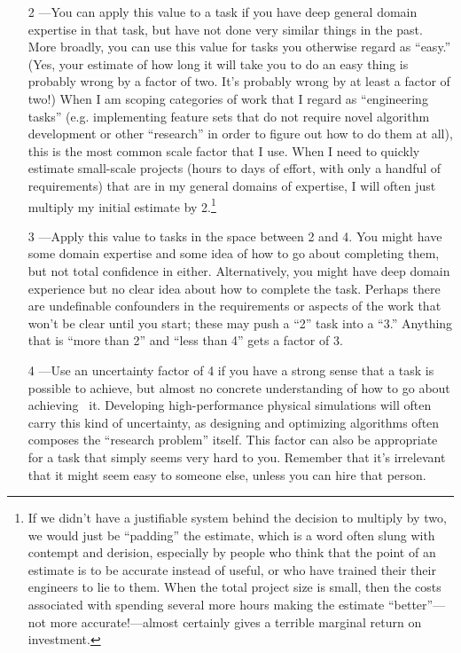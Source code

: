 \documentclass[12pt,oneside]{book}
\begin{document}
\begin{itemize}[wide, labelwidth=!, labelindent=0pt, font=\bfseries]
\item[2]---You can apply this value to a task if you have deep general domain expertise in that task, but have not done very similar things in the past. More broadly, you can use this value for tasks you otherwise regard as ``easy.'' (Yes, your estimate of how long it will take you to do an easy thing is probably wrong by a factor of two. It's probably wrong by at least a factor of two!) When I am scoping categories of work that I regard as ``engineering tasks'' (e.g. implementing feature sets that do not require novel algorithm development or other ``research'' in order to figure out how to do them at all), this is the most common scale factor that I use. When I need to quickly estimate small-scale projects (hours to days of effort, with only a handful of requirements) that are in my general domains of expertise, I will often just multiply my initial estimate by 2.\footnote{If we didn't have a justifiable system behind the decision to multiply by two, we would just be ``padding'' the estimate, which is a word often slung with contempt and derision, especially by people who think that the point of an estimate is to be accurate instead of useful, or who have trained their their engineers to lie to them. When the total project size is small, then the costs associated with spending several more hours making the estimate ``better''---not more accurate!---almost certainly gives a terrible marginal return on investment.}

\item[3]---Apply this value to tasks in the space between 2 and 4. You might have some domain expertise and some idea of how to go about completing them, but not total confidence in either. Alternatively, you might have deep domain experience but no clear idea about how to complete the task. Perhaps there are undefinable confounders in the requirements or aspects of the work that won't be clear until you start; these may push a ``2'' task into a ``3.'' Anything that is ``more than 2'' and ``less than 4'' gets a factor of 3.

\item[4]---Use an uncertainty factor of 4 if you have a strong sense that a task is possible to achieve, but almost no concrete understanding of how to go about achieving  it. Developing high-performance physical simulations will often carry this kind of uncertainty, as designing and optimizing algorithms often composes the ``research problem'' itself. This factor can also be appropriate for a task that simply seems very hard to you. Remember that it's irrelevant that it might seem easy to someone else, unless you can hire that person.
\end{itemize}
\end{document}
